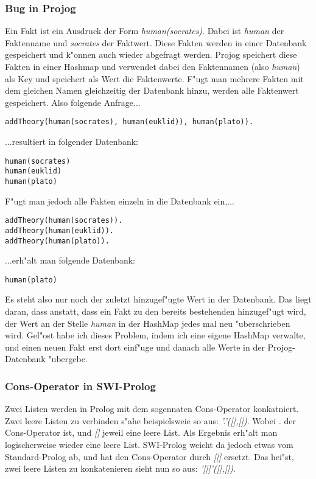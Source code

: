 \subsubsection{Bug in Projog}
Ein Fakt ist ein Ausdruck der Form \emph{human(socrates)}. Dabei ist \emph{human} der Faktenname und \emph{socrates} der Faktwert. Diese Fakten werden in einer Datenbank gespeichert und k"onnen auch wieder abgefragt werden. Projog speichert diese Fakten in einer Hashmap und verwendet dabei den Faktennamen (also \emph{human}) als Key und speichert als Wert die Faktenwerte. F"ugt man mehrere Fakten mit dem gleichen Namen gleichzeitig der Datenbank hinzu, werden alle Faktenwert gespeichert. Also folgende Anfrage...
\begin{verbatim}
addTheory(human(socrates), human(euklid)), human(plato)).
\end{verbatim}
...resultiert in folgender Datenbank:
\begin{verbatim}
human(socrates)
human(euklid)
human(plato)
\end{verbatim}
F"ugt man jedoch alle Fakten einzeln in die Datenbank ein,...
\begin{verbatim}
addTheory(human(socrates)).
addTheory(human(euklid)).
addTheory(human(plato)).
\end{verbatim}
...erh"alt man folgende Datenbank:
\begin{verbatim}
human(plato)
\end{verbatim}
Es steht also nur noch der zuletzt hinzugef"ugte Wert in der Datenbank. Das liegt daran, dass anstatt, dass ein Fakt zu den bereits bestehenden hinzugef"ugt wird, der Wert an der Stelle \emph{human} in der HashMap jedes mal neu "uberschrieben wird. Gel"ost habe ich dieses Problem, indem ich eine eigene HashMap verwalte, und einen neuen Fakt erst dort einf"uge und danach alle Werte in der Projog-Datenbank "ubergebe.
\subsubsection{Cons-Operator in SWI-Prolog}
Zwei Listen werden in Prolog mit dem sogennaten Cons-Operator konkatniert. Zwei leere Listen zu verbinden s"ahe beispielsweie so aus: \emph{'.'([],[])}. Wobei \emph{.} der Cons-Operator ist, und \emph{[]} jeweil eine leere List. Als Ergebnis erh"alt man logischerweise wieder eine leere List. SWI-Prolog weicht da jedoch etwas vom Standard-Prolog ab, und hat den Cons-Operator durch \emph{[|]} ersetzt\cite{cons}. Das hei"st, zwei leere Listen zu konkatenieren sieht nun so aus: \emph{'[|]'([],[])}.

